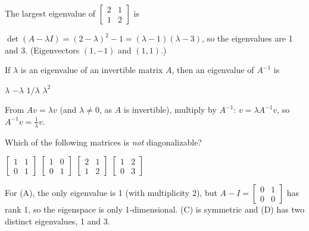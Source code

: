 
\begin{question}[id=eig-1]
The largest eigenvalue of $\begin{bmatrix} 2 & 1 \\ 1 & 2 \end{bmatrix}$ is
\begin{solution}
$\det(A - \lambda I) = (2 - \lambda)^2 - 1 = (\lambda - 1)(\lambda - 3)$, so the eigenvalues are 1 and 3. (Eigenvectors $(1, -1)$ and $(1, 1)$.)
\end{solution}
\end{question}

\begin{question}[id=eig-2]
If $\lambda$ is an eigenvalue of an invertible matrix $A$, then an eigenvalue of $A^{-1}$ is
\begin{options}
  \option $\lambda$
  \option $-\lambda$
  \correct $1/\lambda$
  \option $\lambda^2$
\end{options}
\begin{solution}
From $Av = \lambda v$ (and $\lambda \ne 0$, as $A$ is invertible), multiply by $A^{-1}$: $v = \lambda A^{-1}v$, so $A^{-1}v = \tfrac{1}{\lambda} v$.
\end{solution}
\end{question}

\begin{question}[id=eig-3, marks=2]
Which of the following matrices is \emph{not} diagonalizable?
\begin{options}
  \correct $\begin{bmatrix} 1 & 1 \\ 0 & 1 \end{bmatrix}$
  \option $\begin{bmatrix} 1 & 0 \\ 0 & 1 \end{bmatrix}$
  \option $\begin{bmatrix} 2 & 1 \\ 1 & 2 \end{bmatrix}$
  \option $\begin{bmatrix} 1 & 2 \\ 0 & 3 \end{bmatrix}$
\end{options}
\begin{solution}
For (A), the only eigenvalue is 1 (with multiplicity 2), but $A - I = \begin{bmatrix} 0 & 1 \\ 0 & 0 \end{bmatrix}$ has rank 1, so the eigenspace is only 1-dimensional. (C) is symmetric and (D) has two distinct eigenvalues, 1 and 3.
\end{solution}
\end{question}

